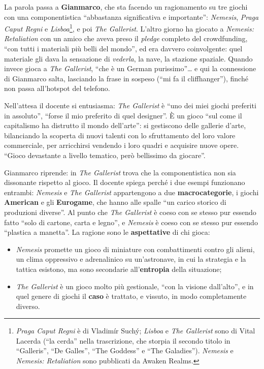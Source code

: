 La parola passa a \textbf{Gianmarco}, che sta facendo un ragionamento su tre
giochi con una componentistica ``abbastanza significativa e importante'':
\emph{Nemesis}, \emph{Praga Caput Regni} e \emph{Lisboa}\footnote{\emph{Praga
Caput Regni} è di Vladimír Suchý; \emph{Lisboa} e \emph{The Gallerist} sono di
Vital Lacerda (``la cerda'' nella trascrizione, che storpia il secondo titolo
in ``Galleris'', ``De Galles'', ``The Goddess'' e ``The Galadies'').
\emph{Nemesis} e \emph{Nemesis: Retaliation} sono pubblicati da Awaken Realms.},
e poi \emph{The Gallerist}. L'altro giorno ha giocato a \emph{Nemesis:
Retaliation} con un amico che aveva preso il \emph{pledge} completo del
crowdfunding, ``con tutti i materiali più belli del mondo'', ed era davvero
coinvolgente: quel materiale gli dava la sensazione di \emph{vederla}, la nave, la
stazione spaziale. Quando invece gioca a \emph{The Gallerist}, ``che è un German
purissimo''\ldots{} e qui la connessione di Gianmarco salta, lasciando la frase
in sospeso (``mi fa il cliffhanger''), finché non passa all'hotspot del telefono.

Nell'attesa il docente si entusiasma: \emph{The Gallerist} è ``uno dei miei giochi
preferiti in assoluto'', ``forse il mio preferito di quel designer''. È un gioco
``sul come il capitalismo ha distrutto il mondo dell'arte'': si gestiscono delle
gallerie d'arte, bilanciando la scoperta di nuovi talenti con lo sfruttamento del
loro valore commerciale, per arricchirsi vendendo i loro quadri e acquisire nuove
opere. ``Gioco devastante a livello tematico, però bellissimo da giocare''.

Gianmarco riprende: in \emph{The Gallerist} trova che la componentistica non sia
dissonante rispetto al gioco. Il docente spiega perché i due esempi funzionano
entrambi: \emph{Nemesis} e \emph{The Gallerist} appartengono a due
\textbf{macrocategorie}, i giochi \textbf{American} e gli \textbf{Eurogame}, che
hanno alle spalle ``un carico storico di produzioni diverse''. Al punto che
\emph{The Gallerist} è coeso con se stesso pur essendo fatto ``solo di cartone,
carta e legno'', e \emph{Nemesis} è coeso con se stesso pur essendo ``plastica a
manetta''. La ragione sono le \textbf{aspettative} di chi gioca:
\begin{itemize}
  \item \emph{Nemesis} promette un gioco di miniature con combattimenti contro gli
        alieni, un clima oppressivo e adrenalinico su un'astronave, in cui la
        strategia e la tattica esistono, ma sono secondarie all'\textbf{entropia}
        della situazione;
  \item \emph{The Gallerist} è un gioco molto più gestionale, ``con la visione
        dall'alto'', e in quel genere di giochi il \textbf{caso} è trattato, e
        vissuto, in modo completamente diverso.
\end{itemize}

